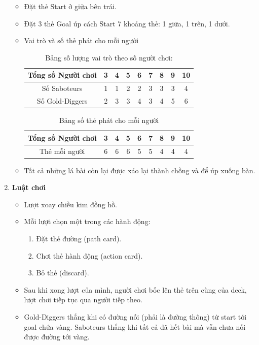 \begin{enumerate}
\begin{itemize}
  \item Đặt thẻ Start ở giữa bên trái.
  \item Đặt 3 thẻ Goal úp cách Start 7 khoảng thẻ: 1 giữa, 1 trên, 1 dưới.
  \item Vai trò và số thẻ phát cho mỗi người\\
    \begin{table}[h]
    \centering
        \begin{tabular}{|c|c|c|c|c|c|c|c|c|}
        \hline
        Tổng số Người chơi & 3 & 4 & 5 & 6 & 7 & 8 & 9 & 10 \\ \hline
        Số Saboteurs     & 1 & 1 & 2 & 2 & 3 & 3 & 3 & 4 \\ \hline
        Số Gold-Diggers  & 2 & 3 & 3 & 4 & 3 & 4 & 5 & 6 \\ \hline
        \end{tabular}
        \caption{Bảng số lượng vai trò theo số người chơi:}
        \label{tab:total-roles}
    \end{table}
    \begin{table}[h]
    \centering
        \begin{tabular}{|c|c|c|c|c|c|c|c|c|}
        \hline
        Tổng số Người chơi      & 3 & 4 & 5 & 6 & 7 & 8 & 9 & 10 \\ \hline
        Thẻ mỗi người      & 6 & 6 & 6 & 5 & 5 & 4 & 4 & 4 \\ \hline
        \end{tabular}
        \caption{Bảng số thẻ phát cho mỗi người}
        \label{tab:cards-per-player}
    \end{table}

    \item Tất cả những lá bài còn lại được xáo lại thành chồng và để úp xuống bàn.
\end{itemize}


\item \textbf{Luật chơi}

\begin{itemize}
  \item Lượt xoay chiều kim đồng hồ.
  \item Mỗi lượt chọn một trong các hành động:
  \begin{enumerate}
    \item Đặt thẻ đường (path card).
    \item Chơi thẻ hành động (action card).
    \item Bỏ thẻ (discard).
  \end{enumerate}
  \item Sau khi xong lượt của mình, người chơi bốc lên thẻ trên cùng của deck, lượt chơi tiếp tục qua người tiếp theo.
  \item Gold-Diggers thắng khi có đường nối (phải là đường thông) từ start tới goal chứa vàng. Saboteurs thắng khi tất cả đã hết bài mà vẫn chưa nối được đường tới vàng.
\end{itemize}


\end{enumerate}
